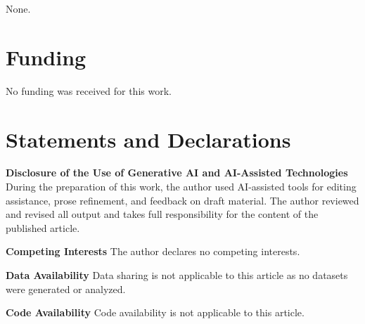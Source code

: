 \documentclass[pdflatex,sn-basic]{sn-jnl}
\begin{document}
\noindent None.

\section*{Funding}

\noindent No funding was received for this work.

\section*{Statements and Declarations}

\noindent\textbf{Disclosure of the Use of Generative AI and AI-Assisted Technologies} During the preparation of this work, the author used AI-assisted tools for editing assistance, prose refinement, and feedback on draft material. The author reviewed and revised all output and takes full responsibility for the content of the published article.

\noindent\textbf{Competing Interests} The author declares no competing interests.

\noindent\textbf{Data Availability} Data sharing is not applicable to this article as no datasets were generated or analyzed.

\noindent\textbf{Code Availability} Code availability is not applicable to this article.
\end{document}

